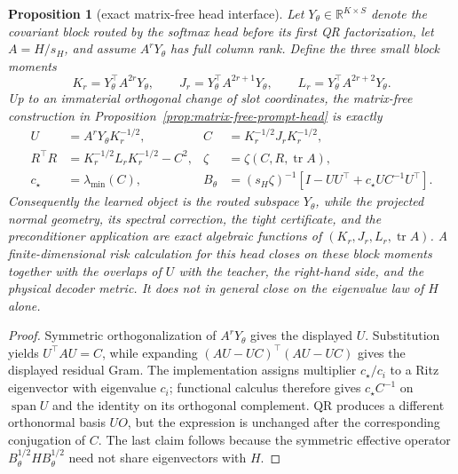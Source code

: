 \documentclass[11pt]{article}
\newtheorem{proposition}{Proposition}
\begin{document}
\begin{proposition}[exact matrix-free head interface]
\label{prop:matrix-free-moment-interface}
Let \(Y_\theta\in\mathbb R^{K\times S}\) denote the covariant block routed by
the softmax head before its first QR factorization, let \(A=H/s_H\), and
assume \(A^rY_\theta\) has full column rank.  Define the three small block
moments
\[
 K_r=Y_\theta^\top A^{2r}Y_\theta,
 \qquad
 J_r=Y_\theta^\top A^{2r+1}Y_\theta,
 \qquad
 L_r=Y_\theta^\top A^{2r+2}Y_\theta .
\]
Up to an immaterial orthogonal change of slot coordinates, the matrix-free
construction in Proposition~\ref{prop:matrix-free-prompt-head} is exactly
\begin{align}
 U&=A^rY_\theta K_r^{-1/2},
 &C&=K_r^{-1/2}J_rK_r^{-1/2},\\
 R^\top R&=K_r^{-1/2}L_rK_r^{-1/2}-C^2,
 &\zeta&=\zeta(C,R,\operatorname{tr}A),\\
 c_\star&=\lambda_{\min}(C),
 &B_\theta&=(s_H\zeta)^{-1}\left[
 I-UU^\top+c_\star UC^{-1}U^\top\right].
 \label{eq:matrix-free-moment-interface}
\end{align}
Consequently the learned object is the routed subspace \(Y_\theta\), while
the projected normal geometry, its spectral correction, the tight
certificate, and the preconditioner application are exact algebraic functions
of \((K_r,J_r,L_r,\operatorname{tr}A)\).  A finite-dimensional risk
calculation for this head closes
on these block moments together with the overlaps of \(U\) with the teacher,
the right-hand side, and the physical decoder metric.  It does not in
general close on the eigenvalue law of \(H\) alone.
\end{proposition}
\begin{proof}
Symmetric orthogonalization of \(A^rY_\theta\) gives the displayed \(U\).
Substitution yields \(U^\top AU=C\), while expanding
\((AU-UC)^\top(AU-UC)\) gives the displayed residual Gram.  The
implementation assigns multiplier
\(c_\star/c_i\) to a Ritz eigenvector with eigenvalue \(c_i\); functional
calculus therefore gives \(c_\star C^{-1}\) on \(\operatorname{span}U\) and
the identity on its orthogonal complement.  QR produces a different
orthonormal basis \(UO\), but the expression is unchanged after the
corresponding conjugation of \(C\).  The last claim follows because the
symmetric effective operator
\(B_\theta^{1/2}HB_\theta^{1/2}\) need not share eigenvectors with \(H\).
\end{proof}
\end{document}
